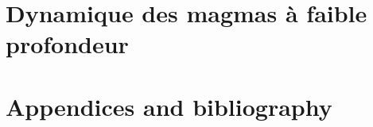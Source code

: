 \documentclass[a4paper,12pt,twoside]{ThesisStyle}
\begin{document}


\dominitoc
\setcounter{tocdepth}{2}

\cleardoublepage



\cleardoublepage





\tableofcontents

\mainmatter
\part{Dynamique des magmas à faible profondeur}

\pagestyle{fancy}

% 
% 

% 
% 
% 

% 
% 
%       


% 

% 
% 
\part{Appendices and bibliography}

% 
% 
% 
% 
% 


\printnomenclature



\end{document}
